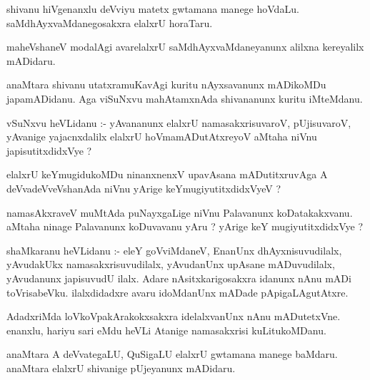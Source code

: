 \documentclass{article}
\begin{document}
\begin{mn}
shivanu  hiVgenanxlu  deVviyu  matetx  gwtamana  manege  hoVdaLu.  saMdhAyxvaMdanegosakxra  elalxrU  horaTaru.
\end{mn}

\begin{mn}
maheVshaneV  modalAgi  avarelalxrU  saMdhAyxvaMdaneyanunx  alilxna  kereyalilx  mADidaru.
\end{mn}

\begin{mn}
anaMtara  shivanu  utatxramuKavAgi  kuritu  nAyxsavanunx  mADikoMDu  japamADidanu.  Aga  
viSuNxvu  mahAtamxnAda  shivananunx  kuritu  iMteMdanu.
\end{mn}

\begin{mn}
vSuNxvu  heVLidanu :- yAvananunx  elalxrU  namasakxrisuvaroV,  pUjisuvaroV,  yAvanige  yajacnxdalilx  
elalxrU  hoVmamADutAtxreyoV  aMtaha  niVnu  japisutitxdidxVye ?
\end{mn}

\begin{mn}
elalxrU  keYmugidukoMDu  ninanxnenxV  upavAsana mADutitxruvAga  A  deVvadeVveVshanAda  niVnu  
yArige  keYmugiyutitxdidxVyeV ?
\end{mn}

\begin{mn}
namasAkxraveV  muMtAda  puNayxgaLige  niVnu  Palavanunx  koDatakakxvanu.  aMtaha  ninage  Palavanunx  
koDuvavanu  yAru ?  yArige  keY  mugiyutitxdidxVye ?
\end{mn}

\begin{mn}
shaMkaranu  heVLidanu :- eleY  goVviMdaneV,  EnanUnx  dhAyxnisuvudilalx,  yAvudakUkx  namasakxrisuvudilalx,  
yAvudanUnx  upAsane  mADuvudilalx,  yAvudanunx  japisuvudU  ilalx.  Adare  nAsitxkarigosakxra  idanunx  nAnu  
mADi  toVrisabeVku.  ilalxdidadxre  avaru  idoMdanUnx  mADade  pApigaLAgutAtxre.
\end{mn}

\begin{mn}
AdadxriMda  loVkoVpakArakokxsakxra  idelalxvanUnx  nAnu  mADutetxVne.  enanxlu,  hariyu  sari  eMdu  heVLi  
Atanige  namasakxrisi  kuLitukoMDanu.
\end{mn}

\begin{mn}
anaMtara  A  deVvategaLU,  QuSigaLU  elalxrU  gwtamana  manege  baMdaru.  anaMtara  elalxrU  shivanige  
pUjeyanunx  mADidaru.
\end{mn}
\end{document}
